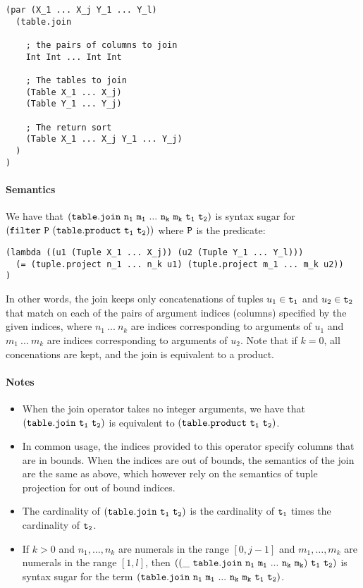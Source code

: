 \documentclass[english,a4paper,10pt]{article}
\begin{document}
\begin{verbatim}
(par (X_1 ... X_j Y_1 ... Y_l)
  (table.join
    
    ; the pairs of columns to join
    Int Int ... Int Int
  
    ; The tables to join
    (Table X_1 ... X_j)
    (Table Y_1 ... Y_j)
    
    ; The return sort
    (Table X_1 ... X_j Y_1 ... Y_j)
  )
)
\end{verbatim}

\paragraph{Semantics}
We have that $\syntax{(table.join\ n_1\ m_1\ ...\ n_k\ m_k\ t_1\ t_2)}$
is syntax sugar for $\syntax{(filter\ P\ (table.product\ t_1\ t_2))}$ where ${\tt P}$ is
the predicate:
\begin{verbatim}
(lambda ((u1 (Tuple X_1 ... X_j)) (u2 (Tuple Y_1 ... Y_l)))
  (= (tuple.project n_1 ... n_k u1) (tuple.project m_1 ... m_k u2))
)
\end{verbatim}
In other words,
the join keeps only concatenations of tuples $u_1 \in {\tt t_1}$ and
$u_2 \in {\tt t_2}$ 
that match on each of the pairs of argument indices (columns) specified by
the given indices,
where $n_1\ ...\ n_k$ are indices corresponding to arguments of $u_1$
and $m_1\ ...\ m_k$ are indices corresponding to arguments of $u_2$.
Note that if $k=0$, all concenations are kept, and the join is
equivalent to a product.

\paragraph{Notes}
\begin{itemize}
\item
When the join operator takes no integer arguments,
we have that ${\tt (table.join\ t_1\ t_2)}$
is equivalent to $\syntax{(table.product\ t_1\ t_2)}$.
\item
In common usage,
the indices provided to this operator specify columns that are in bounds.
When the indices are out of bounds,
the semantics of the join are the same as above, 
which however rely on the semantics of tuple projection for out of bound indices.
\item 
The cardinality of ${\tt (table.join\ t_1\ t_2)}$
is the cardinality of ${\tt t_1}$ times the cardinality of ${\tt t_2}$.
\item
If $k>0$ and $n_1, \ldots, n_k$ are numerals in the range $[0, j-1]$ 
and $m_1, \ldots, m_k$ are numerals in the range $[1, l]$, then
$\syntax{((\_\ table.join\ n_1\ m_1\ ...\ n_k\ m_k)\ t_1\ t_2)}$
is syntax sugar for the term
$\syntax{(table.join\ n_1\ m_1\ ...\ n_k\ m_k\ t_1\ t_2)}$.
\end{itemize}
\end{document}
